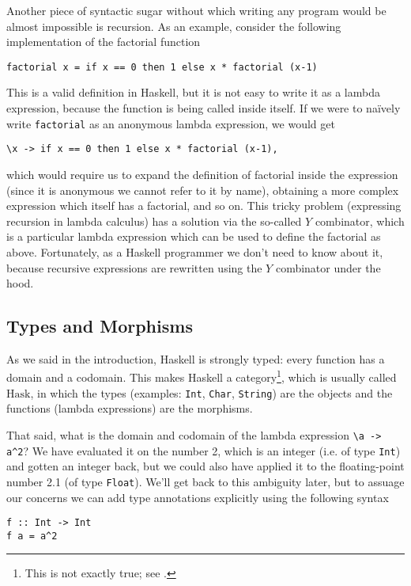 \documentclass[11pt]{article}
\theoremstyle{nonumberplain}
\newcommand{\Hask}{\mathrm{Hask}}
\begin{document}
Another piece of syntactic sugar without which writing any program would be almost impossible is recursion. As an example, consider the following implementation of the factorial function
\begin{lstlisting}
factorial x = if x == 0 then 1 else x * factorial (x-1)
\end{lstlisting}

This is a valid definition in Haskell, but it is not easy to write it as a lambda expression, because the function is being called inside itself. If we were to naïvely write \lstinline|factorial| as an anonymous lambda expression, we would get
\begin{lstlisting}
\x -> if x == 0 then 1 else x * factorial (x-1),
\end{lstlisting}
which would require us to expand the definition of factorial inside the expression (since it is anonymous we cannot refer to it by name), obtaining a more complex expression which itself has a factorial, and so on. This tricky problem (expressing recursion in lambda calculus) has a solution via the so-called $Y$ combinator, which is a particular lambda expression which can be used to define the factorial as above. Fortunately, as a Haskell programmer we don't need to know about it, because recursive expressions are rewritten using the $Y$ combinator under the hood.

\subsection{Types and Morphisms}

As we said in the introduction, Haskell is strongly typed: every function has a domain and a codomain. This makes Haskell a category\footnote{This is not exactly true; see \cite{haskisnotcat}.}, which is usually called $\Hask$, in which the types (examples: \lstinline|Int|, \lstinline|Char|, \lstinline|String|) are the objects and the functions (lambda expressions) are the morphisms.

That said, what is the domain and codomain of the lambda expression \lstinline|\a -> a^2|? We have evaluated it on the number 2, which is an integer (i.e. of type \lstinline|Int|) and gotten an integer back, but we could also have applied it to the floating-point number 2.1 (of type \lstinline|Float|). We'll get back to this ambiguity later, but to assuage our concerns we can add type annotations explicitly using the following syntax
\begin{lstlisting}
f :: Int -> Int
f a = a^2
\end{lstlisting}
\end{document}
